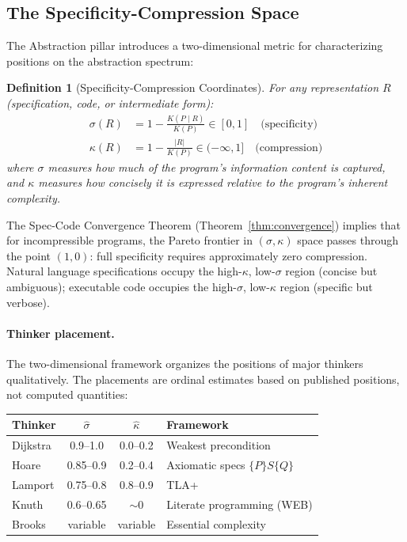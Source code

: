 \documentclass[11pt, a4paper, logo, copyright]{googledeepmind}
\newtheorem{definition}{Definition}[section]
\begin{document}
\subsection{The Specificity-Compression Space}

The Abstraction pillar introduces a two-dimensional metric for characterizing positions on the abstraction spectrum:

\begin{definition}[Specificity-Compression Coordinates]
\label{def:sigma-kappa}
For any representation $R$ (specification, code, or intermediate form):
\begin{align}
    \sigma(R) &= 1 - \frac{K(P \mid R)}{K(P)} \in [0, 1] \quad \text{(specificity)} \\
    \kappa(R) &= 1 - \frac{|R|}{K(P)} \in (-\infty, 1] \quad \text{(compression)}
\end{align}
where $\sigma$ measures how much of the program's information content is captured, and $\kappa$ measures how concisely it is expressed relative to the program's inherent complexity.
\end{definition}

The Spec-Code Convergence Theorem (Theorem~\ref{thm:convergence}) implies that for incompressible programs, the Pareto frontier in $(\sigma, \kappa)$ space passes through the point $(1, 0)$: full specificity requires approximately zero compression. Natural language specifications occupy the high-$\kappa$, low-$\sigma$ region (concise but ambiguous); executable code occupies the high-$\sigma$, low-$\kappa$ region (specific but verbose).

\paragraph{Thinker placement.} The two-dimensional framework organizes the positions of major thinkers qualitatively. The placements are ordinal estimates based on published positions, not computed quantities:

\begin{center}
\small
\begin{tabular}{lccl}
\toprule
\textbf{Thinker} & $\hat{\sigma}$ & $\hat{\kappa}$ & \textbf{Framework} \\
\midrule
Dijkstra & 0.9--1.0 & 0.0--0.2 & Weakest precondition \\
Hoare & 0.85--0.9 & 0.2--0.4 & Axiomatic specs $\{P\}S\{Q\}$ \\
Lamport & 0.75--0.8 & 0.8--0.9 & TLA+ \\
Knuth & 0.6--0.65 & $\sim$0 & Literate programming (WEB) \\
Brooks & variable & variable & Essential complexity \\
\bottomrule
\end{tabular}
\end{center}
\end{document}
